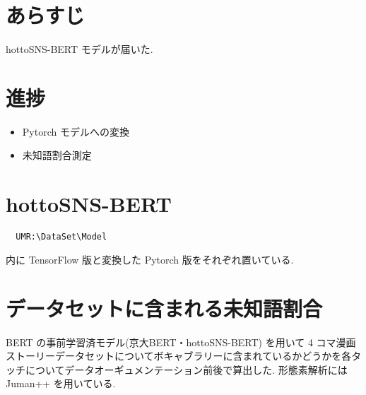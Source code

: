 \documentclass[twocolumn]{jarticle}     %
\begin{document}

\section{あらすじ}
hottoSNS-BERT モデルが届いた.

\section{進捗}

\begin{itemize}
  \item Pytorch モデルへの変換
  \item 未知語割合測定
\end{itemize}

\section{hottoSNS-BERT}
\begin{verbatim}
  UMR:\DataSet\Model
\end{verbatim}

内に TensorFlow 版と変換した Pytorch 版をそれぞれ置いている.

\section{データセットに含まれる未知語割合}

BERT の事前学習済モデル(京大BERT・hottoSNS-BERT) を用いて 4 コマ漫画ストーリーデータセットについてボキャブラリーに含まれているかどうかを各タッチについてデータオーギュメンテーション前後で算出した.
形態素解析には Juman++ を用いている.
\end{document}
